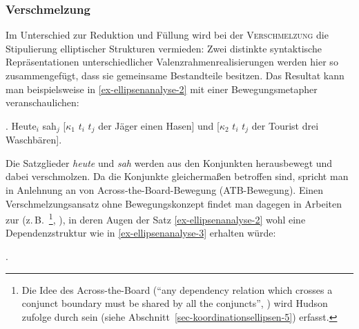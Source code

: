\subsubsection*{Verschmelzung}

Im Unterschied zur Reduktion und Füllung wird bei der \textsc{Verschmelzung} die Stipulierung elliptischer Strukturen vermieden: Zwei distinkte syntaktische Repräsentationen unterschiedlicher Valenzrahmenrealisierungen werden hier so zusammengefügt, dass sie gemeinsame Bestandteile besitzen. Das Resultat kann man beispielsweise in \ref{ex-ellipsenanalyse-2} mit einer Bewegungsmetapher veranschaulichen: 

\ex. \label{ex-ellipsenanalyse-2} Heute$_i$ sah$_j$ [$\kappa_1$ $t_i$ $t_j$ der Jäger einen Hasen] und [$\kappa_2$ $t_i$ $t_j$ der Tourist drei Waschbären]. 

Die Satzglieder {\it heute} und {\it sah} werden aus den Konjunkten herausbewegt und dabei verschmolzen. Da die Konjunkte gleicherma\ss en betroffen sind, spricht man in Anlehnung an \cite{Williams:78,Williams:81} von Across-the-Board-Bewegung (ATB-Bewegung). Einen Verschmelzungsansatz ohne Bewegungskonzept findet man dagegen in Arbeiten zur  (z.\,B.\ \citealt{Hudson:88}\footnote{Die Idee des Across-the-Board ("`any dependency relation which crosses a conjunct boundary must be shared by all the conjuncts"', \citealt[323]{Hudson:88}) wird Hudson zufolge durch sein  (siehe Abschnitt~\ref{sec-koordinationsellipsen-5}) erfasst.}, \citealt{Pickering:Barry:93}), in deren Augen der Satz \ref{ex-ellipsenanalyse-2} wohl eine Dependenzstruktur wie in \ref{ex-ellipsenanalyse-3} erhalten würde:

\vspace{6ex}

\ex. 

